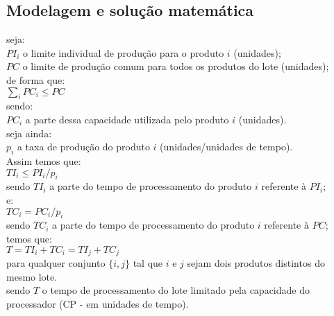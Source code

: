 \documentclass{book}
\begin{document}
\subsection{Modelagem e solução matemática}

seja: \\

$PI_i$ o limite individual de produção para o produto $i$ (unidades); \\

$PC$ o limite de produção comum para todos os produtos do lote (unidades); \\

de forma que: \\

$\sum_i{PC_i} \leq PC$ \\

sendo: \\

$PC_i$ a parte dessa capacidade utilizada pelo produto $i$ (unidades). \\

seja ainda: \\

$p_i$ a taxa de produção do produto $i$ (unidades/unidades de tempo). \\

Assim temos que: \\

$TI_i \leq PI_i/p_i$ \\

sendo $TI_i$ a parte do tempo de processamento do produto $i$ referente à $PI_i$; \\

e: \\

$TC_i = PC_i/p_i$ \\

sendo $TC_i$ a parte do tempo de processamento do produto $i$ referente à $PC$; \\

temos que: \\

$T = TI_{i} + TC_{i} = TI_{j} + TC_{j}$ \\

para qualquer conjunto $\{i,j\}$ tal que $i$ e $j$ sejam dois produtos distintos do mesmo lote. \\

sendo $T$ o tempo de processamento do lote limitado pela capacidade do processador (CP - em unidades de tempo).\\
\end{document}
